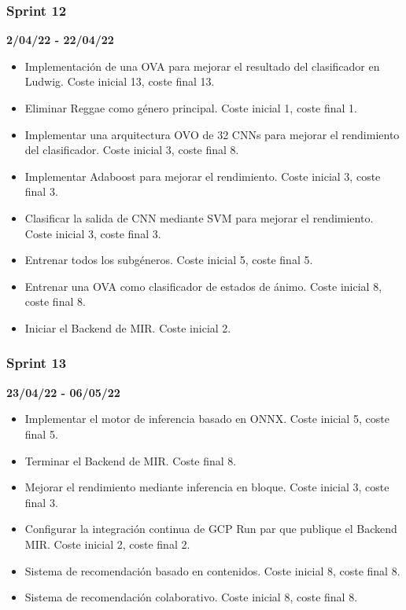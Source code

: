 \subsubsection{Sprint 12}
\textbf{2/04/22 - 22/04/22}
\begin{itemize}
    \item Implementación de una OVA para mejorar el resultado del clasificador en Ludwig. Coste inicial 13, coste final 13.
    \item Eliminar Reggae como género principal. Coste inicial 1, coste final 1.
    \item Implementar una arquitectura OVO de 32 CNNs para mejorar el rendimiento del clasificador. Coste inicial 3, coste final 8.
    \item Implementar Adaboost para mejorar el rendimiento. Coste inicial 3, coste final 3.
    \item Clasificar la salida de CNN mediante SVM para mejorar el rendimiento. Coste inicial 3, coste final 3.
    \item Entrenar todos los subgéneros. Coste inicial 5, coste final 5.
    \item Entrenar una OVA como clasificador de estados de ánimo. Coste inicial 8, coste final 8.
    
    \item Iniciar el Backend de MIR. Coste inicial 2.
    
\end{itemize}

\subsubsection{Sprint 13}
\textbf{23/04/22 - 06/05/22}
\begin{itemize}
    \item Implementar el motor de inferencia basado en ONNX. Coste inicial 5, coste final 5.
    \item Terminar el Backend de MIR. Coste final 8.
    \item Mejorar el rendimiento mediante inferencia en bloque. Coste inicial 3, coste final 3. 
    \item Configurar la integración continua de GCP Run par que publique el Backend MIR. Coste inicial 2, coste final 2.
    \item Sistema de recomendación basado en contenidos. Coste inicial 8, coste final 8.
    \item Sistema de recomendación colaborativo. Coste inicial 8, coste final 8.
\end{itemize}

